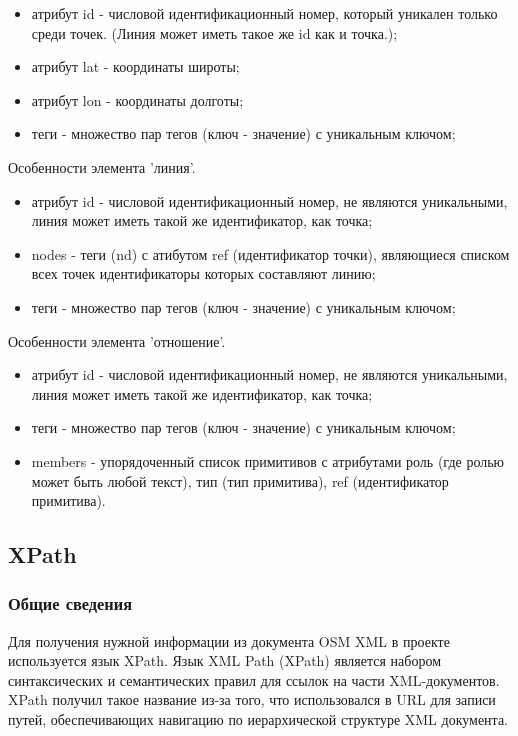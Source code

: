 \documentclass[12pt,a4paper,oneside]{article} %
\begin{document}
\begin{itemize}
\item атрибут id - числовой идентификационный номер, который уникален \linebreak
только среди точек. (Линия может иметь такое же id как и точка.);
\item атрибут lat - координаты широты;
\item атрибут lon - координаты долготы;
\item теги - множество пар тегов (ключ - значение) с уникальным ключом;
\end{itemize}

Особенности элемента 'линия'.

\begin{itemize}
\item атрибут id - числовой идентификационный номер, не являются \linebreak
уникальными, линия может иметь такой же идентификатор, как точка;
\item nodes - теги (nd) с атибутом ref (идентификатор точки), являющиеся \linebreak
списком всех точек идентификаторы которых составляют линию;
\item теги - множество пар тегов (ключ - значение) с уникальным ключом;
\end{itemize}

Особенности элемента 'отношение'.
\begin{itemize}
\item атрибут id - числовой идентификационный номер, не являются \linebreak
уникальными, линия может иметь такой же идентификатор, как точка;
\item теги - множество пар тегов (ключ - значение) с уникальным ключом;
\item members - упорядоченный список примитивов с атрибутами роль \linebreak
(где ролью может быть любой текст), тип (тип примитива), ref \linebreak
(идентификатор примитива).
\end{itemize}

\newpage
\subsection{XPath}
\subsubsection{Общие сведения}
Для получения нужной информации из документа OSM XML в проекте \linebreak
используется язык XPath. Язык XML Path (XPath) является набором \linebreak
синтаксических и семантических правил для ссылок на части \linebreak
XML-документов. XPath получил такое название из-за того, что \linebreak
использовался в URL для записи путей, обеспечивающих навигацию по \linebreak
иерархической структуре XML документа.
\end{document}

